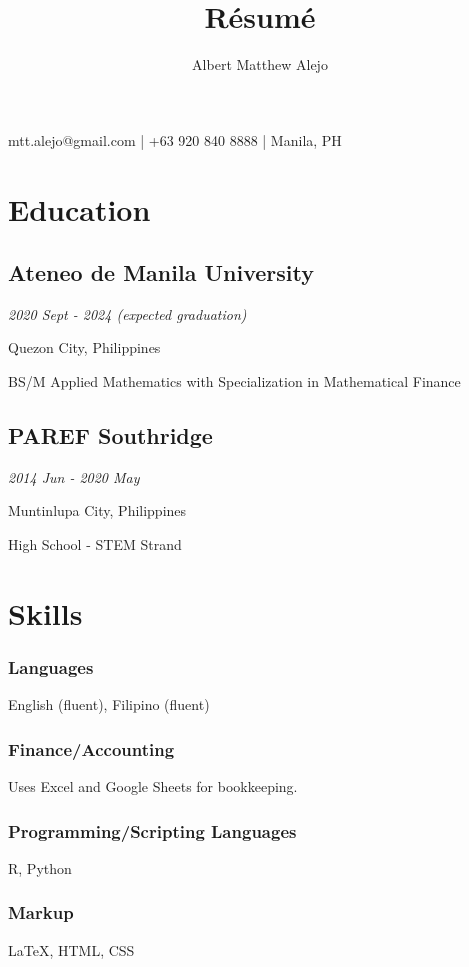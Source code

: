\documentclass[a4paper, 9pt]{article}
\title{R\'esum\'e}
\author{Albert Matthew Alejo}
\makeatletter
\renewcommand{\maketitle}{
\begin{center}
{\huge\bfseries
\theauthor}
\vspace{0.25em}

mtt.alejo@gmail.com | +63 920 840 8888 | Manila, PH

\end{center}
}
\makeatother
\begin{document}
\maketitle

\section{Education}

\subsection{Ateneo de Manila University}
\hfill {\itshape 2020 Sept - 2024 (expected graduation)}

Quezon City, Philippines

\hspace{1em} BS/M Applied Mathematics with Specialization in Mathematical Finance

\subsection{PAREF Southridge} 
\hfill {\itshape 2014 Jun - 2020 May}

Muntinlupa City, Philippines

\hspace{1em} High School - STEM Strand


\section{Skills}

\subsubsection{Languages}
English (fluent), Filipino (fluent)

\subsubsection{Finance/Accounting}
Uses Excel and Google Sheets for bookkeeping.

\subsubsection{Programming/Scripting Languages}
R, Python

\subsubsection{Markup}
\LaTeX, HTML, CSS
\end{document}
